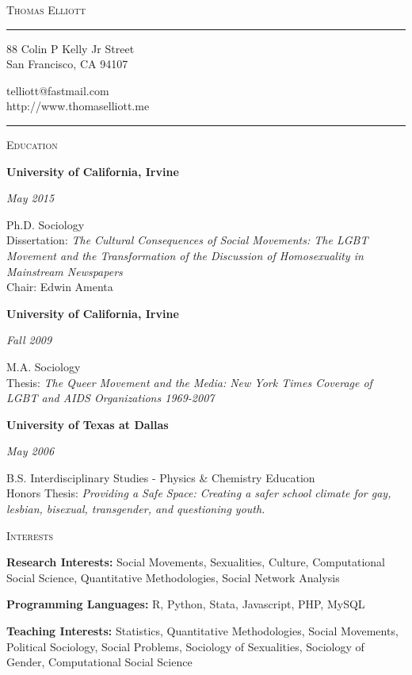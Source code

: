 \documentclass[11pt]{article}
\newcommand{\resumename}[1]{
\begin{center} \Huge
\textsc{#1}
\end{center}}
\newcommand{\sectionheader}[1]{
{\Large
\textsc{#1}}
}
\newcommand{\resumeitem}[2]{
\begin{minipage}{0.7\textwidth}
\begin{flushleft}
\textbf{#1}
\end{flushleft}
\end{minipage}
\begin{minipage}{0.3\textwidth}
\begin{flushright}
\emph{#2}
\end{flushright}
\end{minipage}
\hangindent=0.05\textwidth
}
\begin{document}

\resumename{Thomas Elliott}


\rule{\textwidth}{0.5pt}


\begin{minipage}[t]{0.5\textwidth}
\begin{flushleft}
88 Colin P Kelly Jr Street
\\ San Francisco, CA 94107
\end{flushleft}
\end{minipage}
\begin{minipage}[t]{0.5\textwidth}
\begin{flushright}
telliott@fastmail.com\\
http://www.thomaselliott.me\\
\end{flushright}
\end{minipage}

\rule{\textwidth}{0.5pt}


\sectionheader{Education}

\resumeitem{University of California, Irvine}{May 2015}
Ph.D. Sociology\\
Dissertation: \emph{The Cultural Consequences of Social Movements: The LGBT Movement and the Transformation of the Discussion of Homosexuality in Mainstream Newspapers}\\
Chair: Edwin Amenta

\resumeitem{University of California, Irvine}{Fall 2009}
M.A. Sociology\\
Thesis: \emph{The Queer Movement and the Media: New York Times Coverage of LGBT and AIDS Organizations 1969-2007}

\resumeitem{University of Texas at Dallas}{May 2006}
B.S. Interdisciplinary Studies - Physics \& Chemistry Education\\
Honors Thesis: \emph{Providing a Safe Space: Creating a safer school climate for gay, lesbian, bisexual, transgender, and questioning youth.}

\sectionheader{Interests}

\textbf{Research Interests:} Social Movements, Sexualities, Culture, Computational Social Science, Quantitative Methodologies, Social Network Analysis

\textbf{Programming Languages:} R, Python, Stata, Javascript, PHP, MySQL

\textbf{Teaching Interests:} Statistics, Quantitative Methodologies, Social Movements, Political Sociology, Social Problems, Sociology of Sexualities, Sociology of Gender, Computational Social Science
\end{document}
